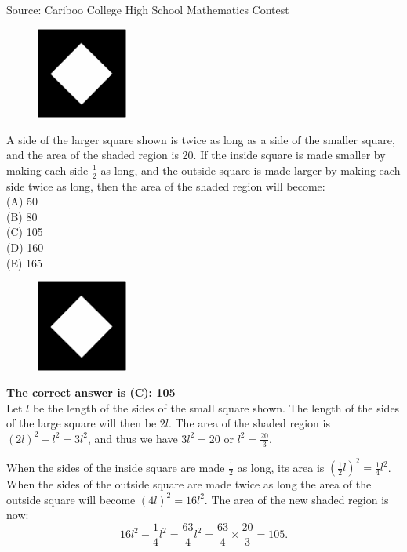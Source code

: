 \documentclass{article}
\begin{document}
\scriptsize
Source: Cariboo College High School Mathematics Contest

\normalsize
\begin{figure}
	\includegraphics[width=30mm,viewport=35 71 520 560]{CCFR74-4pic.eps}
\end{figure}
A side of the larger square shown is twice as long as a side of the smaller square, and the area of the shaded region is 20. If the inside square is made smaller by making each side $\frac{1}{2}$ as long, and the outside square is made larger by making each side twice as long, then the area of the shaded region will become:\\
(A) 50\\
(B) 80\\
(C) 105\\
(D) 160\\
(E) 165\\

\begin{figure}
	\includegraphics[width=30mm,viewport=35 71 520 560]{CCFR74-4pic.eps}
\end{figure}

\textbf{The correct answer is (C): 105}\\[1 ex]
Let $l$ be the length of the sides of the small square shown. The length of the sides of the large square will then be $2l$. The area of the shaded region is $(2l)^2-l^2=3l^2$, and thus we have $3l^2=20$ or $l^2=\frac{20}{3}$.

When the sides of the inside square are made $\frac{1}{2}$ as long, its area is $(\frac{1}{2}l)^2=\frac{1}{4}l^2$. When the sides of the outside square are made twice as long the area of the outside square will become $(4l)^2=16l^2$. The area of the new shaded region is now:
\begin{equation*}
16l^2-\frac{1}{4}l^2=\frac{63}{4}l^2=\frac{63}{4}\times \frac{20}{3}=105.
\end{equation*}
\\[5 ex]
\end{document}
